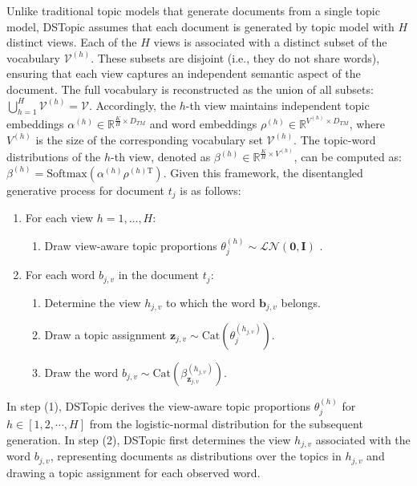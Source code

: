 Unlike traditional topic models that generate documents from a single topic model, DSTopic assumes that each document is generated by topic model with $ H $ distinct views. Each of the $ H $ views is associated with a distinct subset of the vocabulary $\mathcal{V}^{(h)}$. These subsets are disjoint (i.e., they do not share words), ensuring that each view captures an independent semantic aspect of the document. The full vocabulary is reconstructed as the union of all subsets: $ \bigcup_{h=1}^H \mathcal{V}^{(h)} = \mathcal{V} $. 
Accordingly, the $ h $-th view maintains independent topic embeddings $ \alpha^{(h)} \in \mathbb{R}^{\frac{K}{H} \times D_{TM}} $ and word embeddings $ \rho^{(h)} \in \mathbb{R}^{V^{(h)} \times D_{TM}} $, where $ V^{(h)} $ is the size of the corresponding vocabulary set $ \mathcal{V}^{(h)} $. The topic-word distributions of the $ h $-th view, denoted as $ \beta^{(h)} \in \mathbb{R}^{\frac{K}{H} \times V^{(h)}} $, can be computed as: $ \beta^{(h)} = \text{Softmax}(\alpha^{(h)} \rho^{(h)\mathrm{T}}) $. 
Given this framework, the disentangled generative process for document $ t_j $ is as follows:
\begin{enumerate}
    \item For each view $h = 1, \dots, H$:
    \begin{enumerate}
        \item Draw view-aware topic proportions $ \theta_{j}^{(h)} \sim \mathcal{LN}(\mathbf{0}, \mathbf{I}) $ .
    \end{enumerate}
    
    \item For each word $ b_{j,v} $ in the document $ t_j $:
    \begin{enumerate}
        \item Determine the view $ h_{j,v} $ to which the word $ \mathbf{b}_{j,v} $ belongs.
        \item Draw a topic assignment $ \mathbf{z}_{j,v} \sim \text{Cat}(\theta_{j}^{(h_{j,v})}) $.
        \item Draw the word $ b_{j,v} \sim \text{Cat}(\beta_{\mathbf{z}_{j,v}}^{(h_{j,v})}) $.
    \end{enumerate}
\end{enumerate}

In step (1), DSTopic derives the view-aware topic proportions $ \theta_{j}^{(h)} $ for $ h \in [1, 2, \cdots, H] $ from the logistic-normal distribution for the subsequent generation. In step (2), DSTopic first determines the view $ h_{j,v} $ associated with the word $ b_{j,v} $, representing documents as distributions over the topics in $ h_{j,v} $ and drawing a topic assignment for each observed word.


